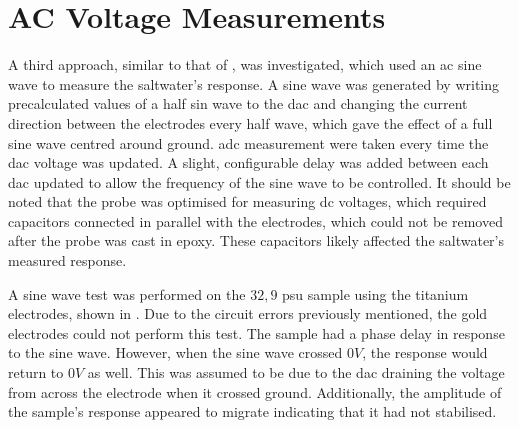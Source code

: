 \section{AC Voltage Measurements}

A third approach, similar to that of , was investigated, which used an \gls{ac} sine wave to measure the saltwater's response.
A sine wave was generated by writing precalculated values of a half sin wave to the \gls{dac} and changing the current direction between the electrodes every half wave, which gave the effect of a full sine wave centred around ground.
\Gls{adc} measurement were taken every time the \gls{dac} voltage was updated.
A slight, configurable delay was added between each \gls{dac} updated to allow the frequency of the sine wave to be controlled.
It should be noted that the probe was optimised for measuring \gls{dc} voltages, which required capacitors connected in parallel with the electrodes, which could not be removed after the probe was cast in epoxy.
These capacitors likely affected the saltwater's measured response.

A sine wave test was performed on the $32,9$ \gls{psu} sample using the titanium electrodes, shown in .
Due to the circuit errors previously mentioned, the gold electrodes could not perform this test.
The sample had a phase delay in response to the sine wave.
However, when the sine wave crossed $0V$, the response would return to $0V$ as well. 
This was assumed to be due to the \gls{dac} draining the voltage from across the electrode when it crossed ground.
Additionally, the amplitude of the sample's response appeared to migrate indicating that it had not stabilised.

